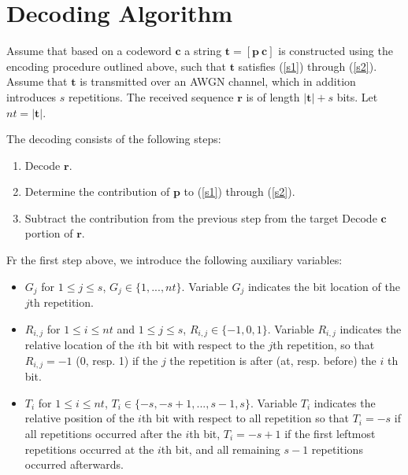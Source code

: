 \section{Decoding Algorithm}\label{dec}

Assume that based on a codeword $\mathbf{c}$ a string
$\mathbf{t}=[\mathbf{p} ~ \mathbf{c}]$ is constructed using the
encoding procedure outlined above, such that $\mathbf{t}$
satisfies (\ref{s1}) through (\ref{s2}). Assume that $\mathbf{t}$
is transmitted over an AWGN channel, which in addition introduces
$s$ repetitions. The received sequence $\mathbf{r}$ is of length
$|\mathbf{t}|+s$ bits. Let $nt=|\mathbf{t}|$.

The decoding consists of the following steps:
\begin{enumerate}
\item Decode $\mathbf{r}$. \item Determine the contribution of
$\mathbf{p}$ to (\ref{s1}) through (\ref{s2}). \item Subtract the
contribution from the previous step from the target Decode
$\mathbf{c}$ portion of $\mathbf{r}$.
\end{enumerate}

Fr the first step above, we introduce the following auxiliary
variables:
\begin{itemize}
\item $G_j$ for $1 \leq j \leq s$, $G_j \in \{1,...,nt\}$.
Variable $G_j$ indicates the bit location of the $j$th repetition.
 \item $R_{i,j}$ for $1\leq i \leq nt$ and $1 \leq j \leq s$, $R_{i,j} \in \{-1,0,1\}$. Variable $R_{i,j}$ indicates the relative
 location of the $i$th bit with respect to the $j$th repetition, so that $R_{i,j}=-1$ (0, resp. 1) if the
 $j$ the repetition is after (at, resp. before) the $i$ th bit.\item
 $T_i$ for  $1\leq i \leq nt$, $T_i \in \{-s,-s+1,...,s-1,s\}$.
 Variable $T_i$ indicates the relative position of the $i$th bit with respect to all
 repetition so that $T_i=-s$ if all repetitions occurred after the
 $i$th bit,  $T_i=-s+1$ if the first leftmost repetitions occurred at the
 $i$th bit, and all remaining $s-1$ repetitions occurred
 afterwards.
\end{itemize}

